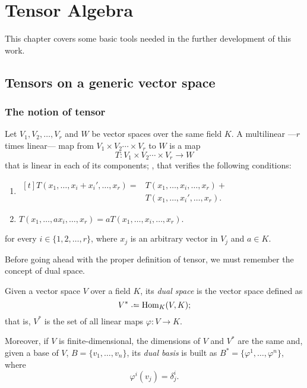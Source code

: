 \chapter{Tensor Algebra}

This chapter covers some basic tools needed in the further development of this work.

\section{Tensors on a generic vector space}

\subsection{The notion of tensor}

\begin{definition}
    Let $V_1, V_2, \dots, V_r$ and $W$ be vector spaces over the same field $K$. A multilinear ---$r$ times linear--- map from $V_1 \times V_2 \cdots \times V_r$ to $W$ is a map
    \[
        T \colon V_1 \times V_2 \cdots \times V_r \longrightarrow W
    \]
    that is linear in each of its components; \ie, that verifies the following conditions:
    \begin{enumerate}
        \item $\begin{aligned}[t]
	        T(x_1, \dots, x_i+x_i', \dots, x_r) = &T(x_1, \dots, x_i, \dots, x_r) + \\&T(x_1, \dots, x_i', \dots, x_r).
        \end{aligned}$
        \item $T(x_1, \dots, a x_i, \dots, x_r) = aT(x_1, \dots, x_i, \dots, x_r)$.
    \end{enumerate}
    for every $i \in \{1, 2, \dots, r\}$, where $x_j$ is an arbitrary vector in $V_j$ and $a \in K$.
\end{definition}

Before going ahead with the proper definition of tensor, we must remember the concept of dual space.

Given a vector space $V$ over a field $K$, its \emph{dual space} is the vector space defined as
\[
	V^* \defeq \Hom_K(V,K);
\]
that is, $V^*$ is the set of all linear maps $\varphi : V \to K$.

Moreover, if $V$ is finite-dimensional, the dimensions of $V$ and $V^*$ are the same and, given a base of $V$, $B = \{v_1, \dots, v_n\}$, its \emph{dual basis} is built as $B^* = \{\varphi^1, \dots, \varphi^n\}$, where
\[
	\varphi^i(v_j) = \delta^i_j.
\]


